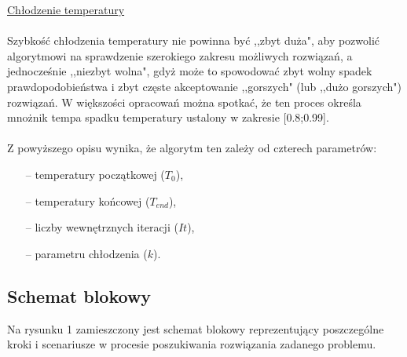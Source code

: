 \documentclass[twoside]{projektInzynierskiMS1}
\newcommand{\newLine}{~\\}
\newcommand{\si}{ś}
\begin{document}
\noindent \underline{Chłodzenie temperatury} \\ \newLine
\indent Szybkość chłodzenia temperatury nie powinna być ,,zbyt duża", aby pozwolić algorytmowi na sprawdzenie szerokiego zakresu możliwych rozwiązań, a jednocześnie ,,niezbyt wolna", gdyż może to spowodować zbyt wolny spadek prawdopodobieństwa i zbyt częste akceptowanie ,,gorszych" (lub ,,dużo gorszych") rozwiązań. W większości opracowań można spotkać, że ten proces okre\si la mnożnik tempa spadku temperatury ustalony w zakresie [0.8;0.99].\\ \newLine
		

Z powyższego opisu wynika, że algorytm ten zależy od czterech parametrów:
\begin{itemize}
	\item[--] temperatury początkowej ($T_0$),
	\item[--] temperatury końcowej ($T_{end}$),
	\item[--] liczby wewnętrznych iteracji ($It$),
	\item[--] parametru chłodzenia ($k$).
\end{itemize}

\subsection{Schemat blokowy}
Na rysunku 1 zamieszczony jest schemat blokowy reprezentujący poszczególne kroki i scenariusze w procesie poszukiwania rozwiązania zadanego problemu.
\end{document}
